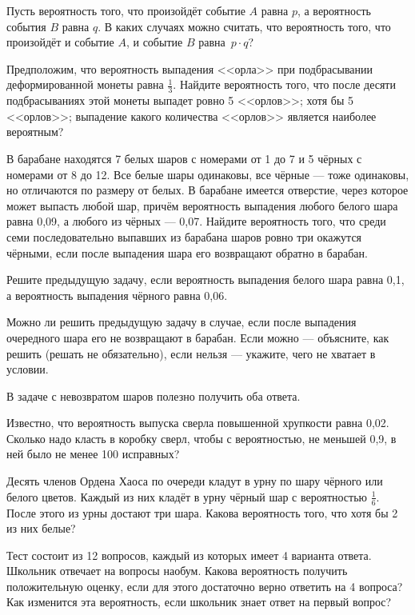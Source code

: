 \documentclass[a4paper,12pt]{article}
\begin{document}
  Пусть вероятность того, что произойдёт событие $A$ равна $p$, а вероятность события $B$ равна $q$. В каких случаях можно считать, что вероятность того, что произойдёт и событие $A$, и событие $B$ равна~$p\cdot q$?

  Предположим, что вероятность выпадения <<орла>> при подбрасывании деформированной монеты равна $\frac{1}{3}$. Найдите вероятность того, что после десяти подбрасываниях этой монеты выпадет  ровно 5 <<орлов>>;  хотя бы 5 <<орлов>>;  выпадение какого количества <<орлов>> является наиболее вероятным?


  В барабане находятся 7 белых шаров с номерами от 1 до 7 и 5 чёрных с номерами от 8 до 12. Все белые шары одинаковы, все чёрные --- тоже одинаковы, но отличаются по размеру от белых. В барабане имеется отверстие, через которое может выпасть любой шар, причём вероятность выпадения любого белого шара равна 0,09, а любого из чёрных --- 0,07. Найдите вероятность того, что среди семи последовательно выпавших из барабана шаров ровно  три окажутся чёрными, если после выпадения шара его возвращают обратно в барабан.

  Решите предыдущую задачу, если вероятность выпадения белого шара равна 0,1, а вероятность выпадения чёрного равна 0,06.

  Можно ли решить предыдущую задачу в случае, если после выпадения очередного шара его не возвращают в барабан. Если можно --- объясните, как решить (решать не обязательно), если нельзя --- укажите, чего не хватает в условии.

    В задаче с невозвратом шаров полезно получить оба ответа.

  Известно, что вероятность выпуска сверла повышенной хрупкости равна 0,02. Сколько надо класть в коробку сверл, чтобы с вероятностью, не меньшей 0,9, в ней было не менее 100 исправных?

  Десять членов Ордена Хаоса по очереди кладут в урну по шару чёрного или белого цветов. Каждый из них кладёт в урну чёрный шар с вероятностью $\frac{1}{6}$. После этого из урны достают три шара. Какова вероятность того, что хотя бы 2 из них белые?

  Тест состоит из 12 вопросов, каждый из которых имеет 4 варианта ответа. Школьник отвечает на вопросы наобум. Какова вероятность получить положительную оценку, если для этого достаточно верно ответить на 4 вопроса? Как изменится эта вероятность, если школьник знает ответ на первый вопрос?
\end{document}
